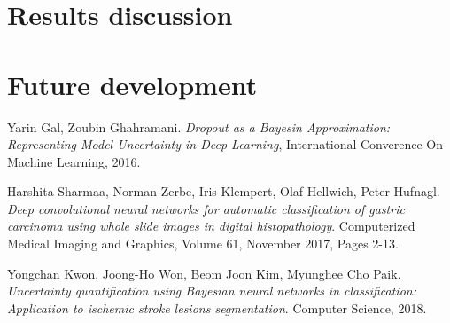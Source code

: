 \documentclass[12pt]{article}
\begin{document}
\section{Results discussion}
\section{Future development}
\newpage
\begin{thebibliography}{9}
	
	Yarin Gal, Zoubin Ghahramani.	\textit{Dropout as a Bayesin Approximation: Representing Model Uncertainty in Deep Learning}, International Converence On Machine Learning, 2016.
	
	Harshita Sharmaa, Norman Zerbe, Iris Klempert, Olaf Hellwich, Peter Hufnagl. \textit{Deep convolutional neural networks for automatic classification of gastric carcinoma using whole slide images in digital histopathology}. Computerized Medical Imaging and Graphics, Volume 61, November 2017, Pages 2-13.
	
	 Yongchan Kwon, Joong-Ho Won, Beom Joon Kim, Myunghee Cho Paik. \textit{Uncertainty quantification using Bayesian neural networks in classification: Application to ischemic stroke lesions segmentation}. Computer Science, 2018.
	
	
\end{thebibliography}
\end{document}
